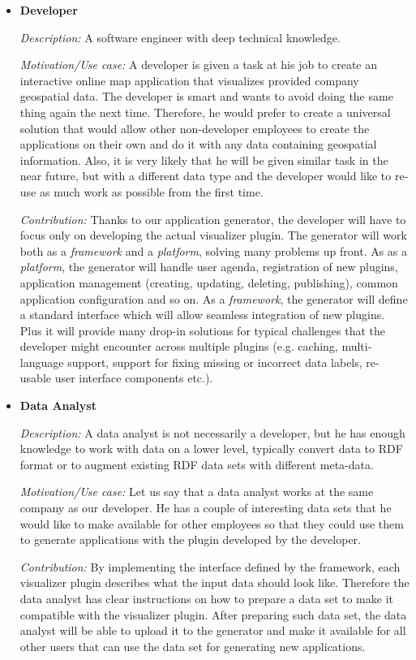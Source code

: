 \begin{itemize}
\item \textbf{Developer}

\textit{Description:} A software engineer with deep technical knowledge.

\textit{Motivation/Use case:} A developer is given a task at his job to create an interactive online map application that visualizes provided company geospatial data. The developer is smart and wants to avoid doing the same thing again the next time. Therefore, he would prefer to create a universal solution that would allow other non-developer employees to create the applications on their own and do it with any data containing geospatial information. Also, it is very likely that he will be given similar task in the near future, but with a different data type and the developer would like to re-use as much work as possible from the first time.

\textit{Contribution:} Thanks to our application generator, the developer will have to focus only on developing the actual visualizer plugin. The generator will work both as a \textit{framework} and a \textit{platform}, solving many problems up front. As as a \textit{platform}, the generator will handle user agenda, registration of new plugins, application management (creating, updating, deleting, publishing), common application configuration and so on. As a \textit{framework}, the generator will define a standard  interface which will allow seamless integration of new plugins. Plus it will provide many drop-in solutions for typical challenges that the developer might encounter across multiple plugins (e.g. caching, multi-language support, support for fixing missing or incorrect data labels, re-usable user interface components etc.).

\item \textbf{Data Analyst}

\textit{Description:} A data analyst is not necessarily a developer, but he has enough knowledge to work with data on a lower level, typically convert data to RDF format or to augment existing RDF data sets with different meta-data. 

\textit{Motivation/Use case:} Let us say that a data analyst works at the same company as our developer. He has a couple of interesting data sets that he would like to make available for other employees so that they could use them to generate applications with the plugin developed by the developer.

\textit{Contribution:} By implementing the interface defined by the framework, each visualizer plugin describes what the input data should look like. Therefore the data analyst has clear instructions on how to prepare a data set to make it compatible with the visualizer plugin. After preparing such data set, the data analyst will be able to upload it to the generator and make it available for all other users that can use the data set for generating new applications.


\end{itemize}
